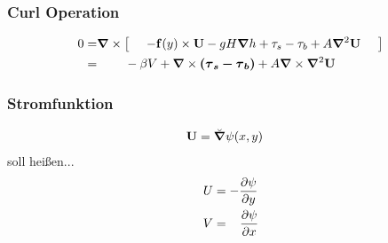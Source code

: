 \begin{frame}
\frametitle{Curl Operation}
\begin{align}
	0
	=&  \mathbf{\bm{\nabla}} \times \left[ \;\;\;\;\;   -\mathbf{\bm{f}}(y) \times \mathbf{\bm{U}}   -    g H \mathbf{\bm{\nabla}}{h} + \mathbf{\tau}_{s} - \mathbf{\tau}_{b} + A  \mathbf{\bm{\nabla}}^{2} \mathbf{\bm{U}}  \;\;\;\;\;   \right]  \nonumber \\
	=& \;\;\;\;\; \;\;\; -\beta V  + \mathbf{\bm{\nabla}} \times \mathbf{\bm{\left( \mathbf{\tau}_{s}- \mathbf{\tau}_{b} \right)}}  + A  \mathbf{\bm{\nabla}} \times \mathbf{\bm{\nabla}}^{2} \mathbf{\bm{U}}    \nonumber 
\end{align}
\end{frame}

\begin{frame}
\frametitle{Stromfunktion}
\begin{align}
 \mathbf{\bm{U}}&=\breve{\mathbf{\bm{\nabla}}} \psi(x,y) 
\end{align}
soll heißen...
\begin{align}
	U &= -\frac{\partial\psi}{\partial y}  \nonumber  \\
	V &= \;\;\; \frac{\partial\psi}{\partial x}   \nonumber 
\end{align}
\end{frame}

